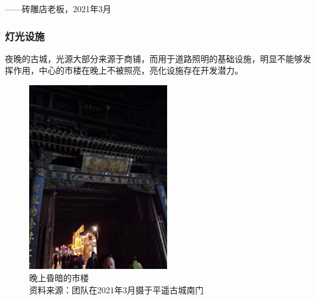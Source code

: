 \documentclass[UTF8]{ctexart}
\begin{document}
        \begin{flushright}
        ——砖雕店老板，2021年3月
        \end{flushright}

        \subsubsection{灯光设施}
        夜晚的古城，光源大部分来源于商铺，而用于道路照明的基础设施，明显不能够发挥作用，中心的市楼在晚上不被照亮，亮化设施存在开发潜力。
        \begin{figure}[H]
            \centering
            \includegraphics[width=6cm]{市楼亮化.jpg}
            \caption[plain]{晚上昏暗的市楼\\资料来源：团队在2021年3月摄于平遥古城南门}
    
        \end{figure}
\end{document}
